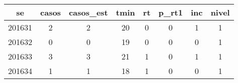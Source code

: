 \begin{tabular}{c|ccccccc}
  \hline
se & casos & casos\_est & tmin & rt & p\_rt1 & inc & nivel \\ 
  \hline
201631 & 2 & 2 & 20 & 0 & 0 & 1 & 1 \\ 
  201632 & 0 & 0 & 19 & 0 & 0 & 0 & 1 \\ 
  201633 & 3 & 3 & 21 & 1 & 0 & 1 & 1 \\ 
  201634 & 1 & 1 & 18 & 1 & 0 & 0 & 1 \\ 
   \hline
\end{tabular}
